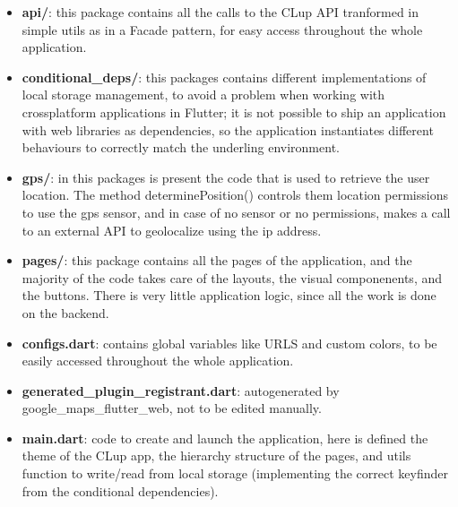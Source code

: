 \begin{itemize}
    \item \textbf{api/}: this package contains all the calls to the CLup API tranformed in simple utils as in a Facade pattern, for easy access throughout the whole application.
    \item \textbf{conditional\_deps/}: this packages contains different implementations of local storage management, to avoid a problem when working with crossplatform applications in Flutter; it is not possible to ship an application with web libraries as dependencies, so the application instantiates different behaviours to correctly match the underling environment.
    \item \textbf{gps/}: in this packages is present the code that is used to retrieve the user location. The method determinePosition() controls them location permissions to use the gps sensor, and in case of no sensor or no permissions, makes a call to an external API to geolocalize using the ip address.
    \item \textbf{pages/}: this package contains all the pages of the application, and the majority of the code takes care of the layouts, the visual componenents, and the buttons. There is very little application logic, since all the work is done on the backend.
    \item \textbf{configs.dart}: contains global variables like URLS and custom colors, to be easily accessed throughout the whole application.
    \item \textbf{generated\_plugin\_registrant.dart}: autogenerated by google\_maps\_flutter\_web, not to be edited manually.
    \item \textbf{main.dart}: code to create and launch the application, here is defined the theme of the CLup app, the hierarchy structure of the pages, and utils function to write/read from local storage (implementing the correct keyfinder from the conditional dependencies).
\end{itemize}